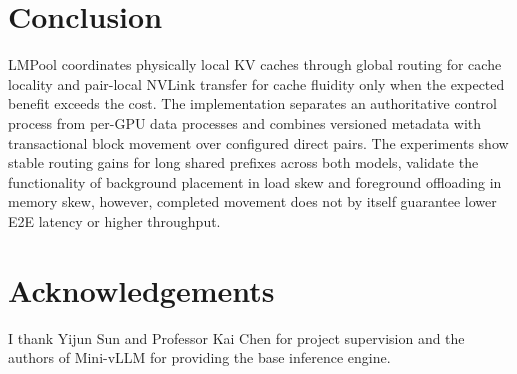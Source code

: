 \documentclass{article}
\newcommand{\sys}{LMPool}
\begin{document}
\section{Conclusion}
\label{sec:concl}

\sys{} coordinates physically local KV caches through global routing for cache locality and pair-local NVLink transfer for cache fluidity only when the expected benefit exceeds the cost. The implementation separates an authoritative control process from per-GPU data processes and combines versioned metadata with transactional block movement over configured direct pairs. The experiments show stable routing gains for long shared prefixes across both models, validate the functionality of background placement in load skew and foreground offloading in memory skew, however, completed movement does not by itself guarantee lower E2E latency or higher throughput.

\section*{Acknowledgements}
I thank Yijun Sun and Professor Kai Chen for project supervision and the authors of Mini-vLLM for providing the base inference engine.



\end{document}
